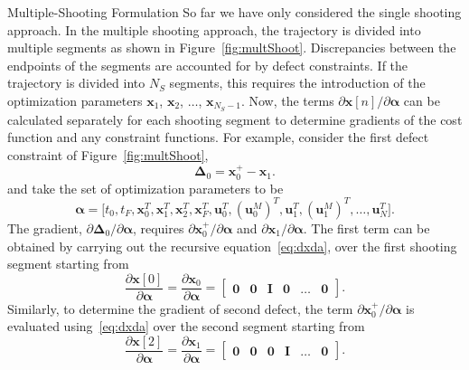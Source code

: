 \documentclass[onecolumn,11pt]{article}
\makeatletter
\newcommand{\bs}{\boldsymbol}
\def\section{\@startsection {section}{1}{\z@}{24pt plus 2pt minus 2pt}
{12pt plus 2pt minus 2pt}{\large\bf\color{RoyalBlue}}}
\makeatother
\begin{document}
\section{Multiple-Shooting Formulation}
So far we have only considered the single shooting approach. In the multiple shooting approach, the trajectory is divided into multiple segments as shown in Figure~\ref{fig:multShoot}. Discrepancies between the endpoints of the segments are accounted for by defect constraints. If the trajectory is divided into $N_S$ segments, this requires the introduction of the optimization parameters $\bs x_1$, $\bs x_2$, $\dots$, $\bs x_{N_S-1}$. Now, the terms $\partial \bs x[n]/\partial \bs \alpha$ can be calculated separately for each shooting segment to determine gradients of the cost function and any constraint functions. For example, consider the first defect constraint of Figure~\ref{fig:multShoot},
\begin{equation*}
\bs\Delta_0 = \bs x_0^{+} - \bs x_1.
\end{equation*}
and take the set of optimization parameters to be 
\begin{equation*}
\bs \alpha = \lbrack t_0, t_F, \bs x_0^T, \bs x_1^T, \bs x_2^T, \bs x_{F}^T, \bs u_0^T, (\bs u^M_0)^T, \bs u_1^T, (\bs u^M_1)^T, \dots , \bs u_N^T \rbrack.
\end{equation*}
The gradient, $\partial \bs\Delta_0/\partial \bs\alpha$, requires $\partial\bs x_0^{+}/\partial \bs \alpha$ and $\partial\bs x_1/\partial \bs \alpha$. The first term can be obtained by carrying out the recursive equation~\eqref{eq:dxda}, over the first shooting segment starting from 
\begin{equation}
\frac{\partial \bs x[0]}{\partial \bs \alpha} = 
\frac{\partial \bs x_0}{\partial \bs \alpha} =
\begin{bmatrix}
\bs 0 & \bs 0 & \bs I & \bs 0 & \dots & \bs 0
\end{bmatrix}.
\end{equation}
Similarly, to determine the gradient of second defect, the term $\partial\bs x_0^{+}/\partial \bs \alpha$ is evaluated using~\eqref{eq:dxda} over the second segment starting from 
\begin{equation}
\frac{\partial \bs x[2]}{\partial \bs \alpha} = 
\frac{\partial \bs x_1}{\partial \bs \alpha} =
\begin{bmatrix}
\bs 0 & \bs 0 & \bs 0 & \bs I & \dots & \bs 0
\end{bmatrix}.
\end{equation}
\end{document}
